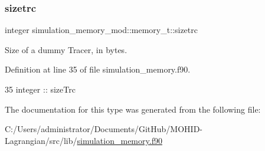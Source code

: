 \subsubsection{\texorpdfstring{sizetrc}{sizetrc}}
{\footnotesize\ttfamily integer simulation\+\_\+memory\+\_\+mod\+::memory\+\_\+t\+::sizetrc\hspace{0.3cm}{\ttfamily [private]}}



Size of a dummy Tracer, in bytes. 



Definition at line 35 of file simulation\+\_\+memory.\+f90.


\begin{DoxyCode}
35         \textcolor{keywordtype}{integer} :: sizeTrc
\end{DoxyCode}


The documentation for this type was generated from the following file\+:\begin{DoxyCompactItemize}
\item 
C\+:/\+Users/administrator/\+Documents/\+Git\+Hub/\+M\+O\+H\+I\+D-\/\+Lagrangian/src/lib/\mbox{\hyperlink{simulation__memory_8f90}{simulation\+\_\+memory.\+f90}}\end{DoxyCompactItemize}
